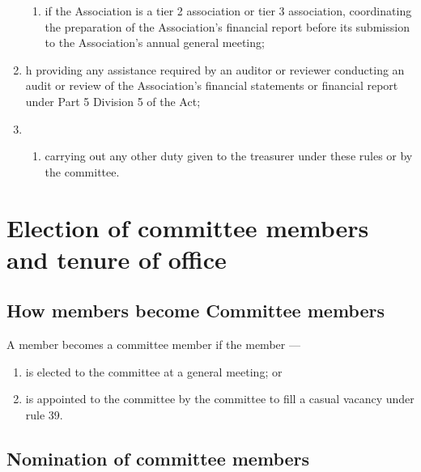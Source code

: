 \documentclass[../constitution.tex]{subfiles}
\begin{document}
\begin{enumerate}
\begin{enumerate}
  \item if the Association is a tier 2 association or tier 3 association, coordinating the preparation of the Association's financial report before its submission to the Association's annual general meeting;
  \end{enumerate}
\item h providing any assistance required by an auditor or reviewer conducting an audit or review of the Association's financial statements or financial report under Part 5 Division 5 of the Act;
\item \begin{enumerate}
  \def\labelenumi{\roman{enumi})}
  
  \item carrying out any other duty given to the treasurer under these rules or by the committee.
  \end{enumerate}
\end{enumerate}

\hypertarget{division-3-election-of-committee-members-and-tenure-of-office}{%
\section{Election of committee members and tenure of office}\label{division-3-election-of-committee-members-and-tenure-of-office}}

\hypertarget{how-members-become-committee-members}{%
\subsection{How members become Committee members}\label{how-members-become-committee-members}}

A member becomes a committee member if the member ---

\begin{enumerate}

\item is elected to the committee at a general meeting; or
\item is appointed to the committee by the committee to fill a casual vacancy under rule 39.
\end{enumerate}

\hypertarget{nomination-of-committee-members}{%
\subsection{Nomination of committee members}\label{nomination-of-committee-members}}
\end{document}
